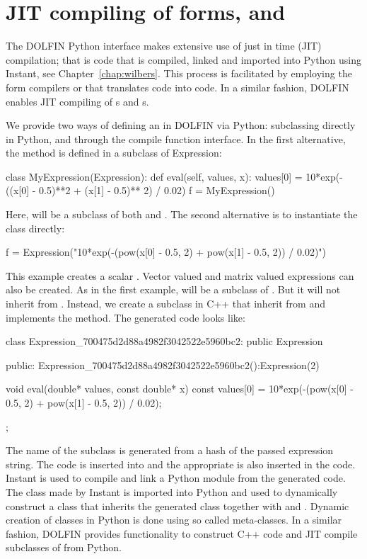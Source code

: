 \section{JIT compiling of \ufl forms,  and }
The DOLFIN Python interface makes extensive use of just in time (JIT) compilation;
that is code that is compiled, linked and imported into Python using
Instant, see Chapter~\ref{chap:wilbers}. This process is facilitated
by employing the form compilers \ffc or \sfc that translates \ufl code
into \ufc code.  In a similar fashion, DOLFIN enables JIT compiling
of s and s.

We provide two ways of defining an  in DOLFIN via Python:
subclassing  directly in Python, and through the compile
function interface. In the first alternative, the  method is
defined in a subclass of Expression:
\begin{python}
class MyExpression(Expression):
    def eval(self, values, x):
        values[0] = 10*exp(-((x[0] - 0.5)**2 + (x[1] - 0.5)** 2) / 0.02)
f = MyExpression()
\end{python}
Here,  will be a subclass of both  and
.  The second alternative is to instantiate the
 class directly:
\begin{python}
f = Expression("10*exp(-(pow(x[0] - 0.5, 2) + pow(x[1] - 0.5, 2)) / 0.02)")
\end{python}
This example creates a scalar . Vector valued and matrix
valued expressions can also be created. As in the first example, 
will be a subclass of . But it will not inherit from
.  Instead, we create a subclass in C++ that inherit
from  and implements the  method.
The generated code looks like:
\begin{c++}
class Expression_700475d2d88a4982f3042522e5960bc2: public Expression{
public:
  Expression_700475d2d88a4982f3042522e5960bc2():Expression(2){}

  void eval(double* values, const double* x) const{
    values[0] = 10*exp(-(pow(x[0] - 0.5, 2) + pow(x[1] - 0.5, 2)) / 0.02);
  }
};
\end{c++}
The name of the subclass is generated from a hash of the passed
expression string. The code is inserted into  and
the appropriate  is also inserted in the code. Instant is
used to compile and link a Python module from the generated code. The
class made by Instant is imported into Python and used to dynamically
construct a class that inherits the generated class together with
 and .  Dynamic creation of classes
in Python is done using so called meta-classes.  In a similar fashion,
DOLFIN provides functionality to construct C++ code and JIT compile
subclasses of  from Python.


